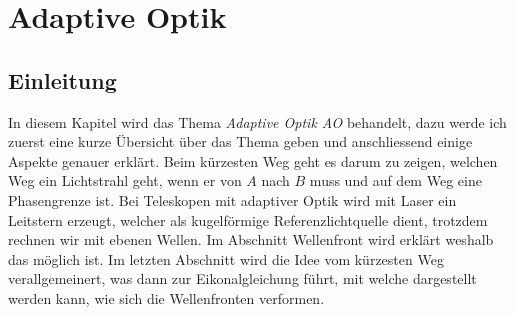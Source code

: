 \chapter{Adaptive Optik\label{chapter:thema}}
\begin{refsection}

\section{Einleitung}
In diesem Kapitel wird das Thema \textit{Adaptive Optik AO} behandelt,
%
dazu werde ich zuerst eine kurze Übersicht über das Thema geben und
anschliessend einige Aspekte genauer erklärt. Beim kürzesten Weg
geht es darum zu zeigen, welchen Weg ein Lichtstrahl geht, wenn
er von $A$ nach $B$ muss und auf dem Weg eine Phasengrenze ist. Bei
Teleskopen mit adaptiver Optik wird mit Laser ein Leitstern erzeugt,
welcher als kugelförmige Referenzlichtquelle dient, trotzdem rechnen
wir mit ebenen Wellen. Im Abschnitt Wellenfront wird erklärt weshalb
das möglich ist. Im letzten Abschnitt wird die Idee vom kürzesten
Weg verallgemeinert, was dann zur Eikonalgleichung führt, mit welche
dargestellt werden kann, wie sich die Wellenfronten verformen.


\end{refsection}
